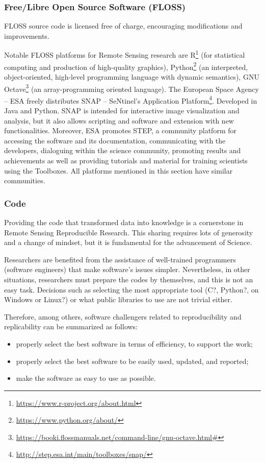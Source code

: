 \documentclass[journal,twoside]{IEEEtran}
\begin{document}
\subsubsection{Free/Libre Open Source Software (FLOSS)}

FLOSS source code is licensed free of charge, encouraging modifications and improvements.

Notable FLOSS platforms for Remote Sensing research are 
R\footnote{\url{https://www.r-project.org/about.html}} (for statistical computing and production of high-quality graphics),
Python\footnote{\url{https://www.python.org/about/}} (an interpreted, object-oriented, high-level programming language with dynamic semantics),
GNU Octave\footnote{\url{https://booki.flossmanuals.net/command-line/gnu-octave.html#}} (an array-programming oriented language).
The European Space Agency -- ESA freely distributes SNAP -- SeNtinel’s Application Platform\footnote{\url{http://step.esa.int/main/toolboxes/snap/}}.
Developed in Java and Python.
SNAP is intended for interactive image visualization and analysis, but it also allows scripting and software and extension with new functionalities.
Moreover, ESA promotes STEP, a community platform for accessing the software and its documentation, communicating with the developers, dialoguing within the science community, promoting results and achievements as well as providing tutorials and material for training scientists using the Toolboxes.
All platforms mentioned in this section have similar communities.

\subsubsection{Code}

Providing the code that transformed data into knowledge is a cornerstone in Remote Sensing Reproducible Research.
This sharing requires lots of generosity and a change of mindset, but it is fundamental for the advancement of Science.

Researchers are benefited from the assistance of well-trained programmers (software engineers) that make software's issues simpler. 
Nevertheless, in other situations, researchers must prepare the codes by themselves, and this is not an easy task. 
Decisions such as selecting the most appropriate tool (C?, Python?, on Windows or Linux?) or what public libraries to use are not trivial either.

Therefore, among others, software challengers related to reproducibility and replicability can be summarized as follows:
\begin{itemize}
	\item properly select the best software in terms of efficiency, to support the work;
	\item properly select the best software to be easily used, updated, and reported;
	\item make the software as easy to use as possible.
\end{itemize}
\end{document}

